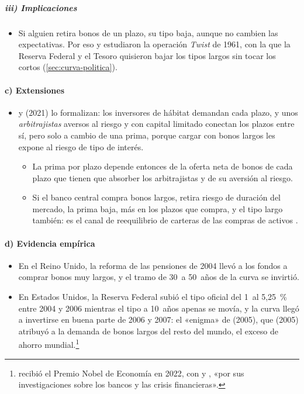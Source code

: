 \documentclass[11pt]{article}
\begin{document}
\subparagraph{iii) Implicaciones}
\begin{itemize}
\item Si alguien retira bonos de un plazo, su tipo baja, aunque no cambien las expectativas. Por eso  y  estudiaron la operación \emph{Twist} de 1961, con la que la Reserva Federal y el Tesoro quisieron bajar los tipos largos sin tocar los cortos (\ref{sec:curva-politica}).
\end{itemize}

\paragraph{c) Extensiones}
\begin{itemize}
\item {} y  (2021)\nocite{VayanosVila2021Preferred} lo formalizan: los inversores de hábitat demandan cada plazo, y unos \emph{arbitrajistas} aversos al riesgo y con capital limitado conectan los plazos entre sí, pero solo a cambio de una prima, porque cargar con bonos largos les expone al riesgo de tipo de interés.
  \begin{itemize}
  \item La prima por plazo depende entonces de la oferta neta de bonos de cada plazo que tienen que absorber los arbitrajistas y de su aversión al riesgo.
  \item Si el banco central compra bonos largos, retira riesgo de duración del mercado, la prima baja, más en los plazos que compra, y el tipo largo también: es el canal de reequilibrio de carteras de las compras de activos  .
  \end{itemize}
\end{itemize}

\paragraph{d) Evidencia empírica}
\begin{itemize}
\item En el Reino Unido, la reforma de las pensiones de 2004 llevó a los fondos a comprar bonos muy largos, y el tramo de 30~a 50~años de la curva se invirtió\nocite{GreenwoodVayanos2010Price}.
\item En Estados Unidos, la Reserva Federal subió el tipo oficial del 1~al 5,25~\% entre 2004 y 2006 mientras el tipo a 10~años apenas se movía, y la curva llegó a invertirse en buena parte de 2006 y 2007\nocite{UST2026ParYield}: el «enigma» de  (2005)\nocite{Greenspan2005Testimony}, que  (2005)\nocite{Bernanke2005Glut} atribuyó a la demanda de bonos largos del resto del mundo, el exceso de ahorro mundial.\footnote{ recibió el Premio Nobel de Economía en 2022, con  y , «por sus investigaciones sobre los bancos y las crisis financieras»\nocite{Nobel2022Bancos}.}
\end{itemize}
\end{document}
